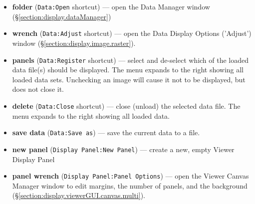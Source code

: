 \begin{itemize}
   \item {\bf folder} ({\tt Data:Open} shortcut) --- open the Data Manager window (\S \ref{section:display.dataManager})
   \item {\bf wrench} ({\tt Data:Adjust} shortcut) --- open the Data Display Options ('Adjust') window (\S \ref{section:display.image.raster}).
   \item {\bf panels} ({\tt Data:Register} shortcut) --- select and de-select which of the loaded
             data file(s) should be displayed. The menu expands
	     to the right showing all loaded data sets. Unchecking an image
	     will cause it not to be displayed, but does not close it. 
   \item {\bf delete} ({\tt Data:Close} shortcut) --- close (unload) the selected data file. The menu
             expands to the right showing all loaded data.
   \item {\bf save data} ({\tt Data:Save as}) --- save the current data to a file.
   \item {\bf new panel} ({\tt Display Panel:New Panel}) --- create a new, empty Viewer Display Panel
   \item {\bf panel wrench} ({\tt Display Panel:Panel Options}) --- open the Viewer Canvas Manager window to edit margins, the number of panels, and the background (\S \ref{section:display.viewerGUI.canvas.multi}).
   

\end{itemize}
